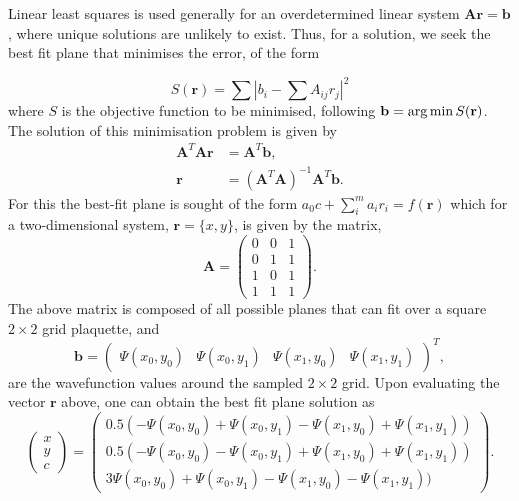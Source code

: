  Linear least squares is used generally for an overdetermined linear system $\mathbf{A}\mathbf{r} = \mathbf{b}$, where unique solutions are unlikely to exist. Thus, for a solution, we seek the best fit plane that minimises the error, of the form

 \begin{equation}
 S(\mathbf{r}) = \displaystyle\sum |b_i - \displaystyle\sum A_{ij} r_j |^2
 \end{equation}
 where $S$ is the objective function to be minimised, following $\mathbf{b} = \operatorname*{arg\,min} S(\mathbf{r})$. The solution of this minimisation problem is given by
 \begin{subequations}
\begin{align}
    \mathbf{A} ^{T}\mathbf{A} \mathbf{r} &= \mathbf{A} ^{T}\mathbf{b}, \\
    \mathbf{r} &= (\mathbf{A}^{T}\mathbf{A})^{-1}\mathbf{A}^{T}\mathbf{b}.
\end{align}
\end{subequations}
For this the best-fit plane is sought of the form
$a_0 c + \displaystyle\sum\limits_{i}^{m} a_i r_i = f(\mathbf{r})$
which for a two-dimensional system, $\mathbf{r} = \{x,y\}$, is given by the matrix,
\begin{equation}
    \mathbf{A} = \left(
    \begin{array}{ccc}
        0 & 0 & 1 \\
        0 & 1 & 1 \\
        1 & 0 & 1 \\
        1 & 1 & 1
    \end{array}\right).
\end{equation}
The above matrix is composed of all possible planes that can fit over a square $2\times 2$ grid plaquette,
and
\begin{equation}
    \mathbf{b} = \left(
    \begin{array}{cccc}
        \Psi(x_0,y_0) & \Psi(x_0,y_1) & \Psi(x_1,y_0) & \Psi(x_1,y_1)
    \end{array} \right)^{T},
\end{equation}
are the wavefunction values around the sampled $2\times 2$ grid.
Upon evaluating the vector $\mathbf{r}$ above, one can obtain the best fit plane  solution as
\begin{equation}\left(
    \begin{array}{c}
        x \\
        y \\
        c
    \end{array}\right)
    = \left(
    \begin{array}{c}
        0.5( -\Psi(x_0,y_0) + \Psi(x_0,y_1) - \Psi(x_1,y_0) + \Psi(x_1,y_1) ) \\
        0.5( -\Psi(x_0,y_0) - \Psi(x_0,y_1) + \Psi(x_1,y_0) + \Psi(x_1,y_1) ) \\
        3\Psi(x_0,y_0) + \Psi(x_0,y_1) - \Psi(x_1,y_0) - \Psi(x_1,y_1) )
    \end{array}\right).
\end{equation}

